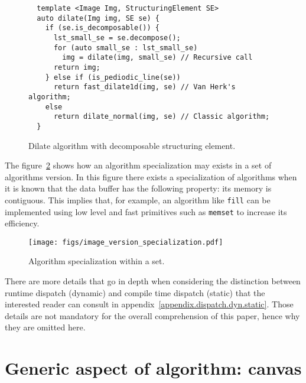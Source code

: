 \begin{figure}[tbh]
  \centering
  \begin{verbatim}
  template <Image Img, StructuringElement SE>
  auto dilate(Img img, SE se) {
    if (se.is_decomposable()) {
      lst_small_se = se.decompose();
      for (auto small_se : lst_small_se)
        img = dilate(img, small_se) // Recursive call
      return img;
    } else if (is_pediodic_line(se))
      return fast_dilate1d(img, se) // Van Herk's algorithm;
    else
      return dilate_normal(img, se) // Classic algorithm;
  }
  \end{verbatim}

  \caption{Dilate algorithm with decomposable structuring element.}
  \label{fig.decomp.dilate}
\end{figure}

The figure~\ref{fig.image.specialization} shows how an algorithm specialization may exists in a set of algorithms
version. In this figure there exists a specialization of algorithms when it is known that the data buffer has the
following property: its memory is contiguous. This implies that, for example, an algorithm like \texttt{fill} can be
implemented using low level and fast primitives such as \texttt{memset} to increase its efficiency.

\begin{figure}[tbh]
  \centering
  \texttt{[image: figs/image\_version\_specialization.pdf]}
  \caption{Algorithm specialization within a set.}
  \label{fig.image.specialization}
\end{figure}

There are more details that go in depth when considering the distinction between runtime dispatch (dynamic) and
compile time dispatch (static) that the interested reader can consult in appendix~\ref{appendix.dispatch.dyn.static}.
Those details are not mandatory for the overall comprehension of this paper, hence why they are omitted here.


\section{Generic aspect of algorithm: canvas}
\label{sec.algo}


